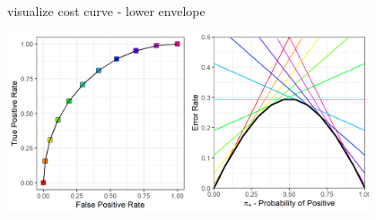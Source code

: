 \documentclass[11pt,compress,t,notes=noshow, xcolor=table]{beamer}
\begin{document}
\begin{frame}{visualize cost curve - lower envelope}
{\begin{center}
    \end{center}
  }
   {
    \begin{center}
      \includegraphics[width=0.8\textwidth]{figure/lower_envelope_11.png}
    \end{center}
  }

\end{frame}

\end{document}

